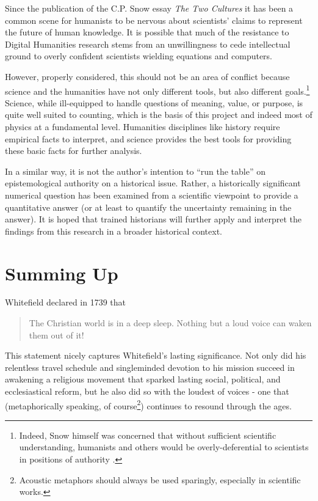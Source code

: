 Since the publication of the C.P. Snow essay {\it The Two Cultures} \cite{Snow1959} it has been a common scene for humanists to be nervous about scientists' claims to represent the future of human knowledge. It is possible that much of the resistance to Digital Humanities research stems from an unwillingness to cede intellectual ground to overly confident scientists wielding equations and computers. 

However, properly considered, this should not be an area of conflict because science and the humanities have not only different tools, but also different goals.\footnote{Indeed, Snow himself was concerned that without sufficient scientific understanding, humanists and others would be overly-deferential to scientists in positions of authority \cite{Snow1960}.} Science, while ill-equipped to handle questions of meaning, value, or purpose, is quite well suited to counting, which is the basis of this project and indeed most of physics at a fundamental level. Humanities disciplines like history require empirical facts to interpret, and science provides the best tools for providing these basic facts for further analysis. 

In a similar way, it is not the author's intention to ``run the table'' on epistemological authority on a historical issue. Rather, a historically significant numerical question has been examined from a scientific viewpoint to provide a quantitative answer (or at least to quantify the uncertainty remaining in the answer). It is hoped that trained historians will further apply and interpret the findings from this research in a broader historical context.

\section{Summing Up}

Whitefield declared in 1739 that

\begin{quote}
The Christian world is in a deep sleep. Nothing but a loud voice can waken them out of it! \cite{Vaudry2003}
\end{quote}

\noindent This statement nicely captures Whitefield's lasting significance. Not only did his relentless travel schedule and singleminded devotion to his mission succeed in awakening a religious movement that sparked lasting social, political, and ecclesiastical reform, but he also did so with the loudest of voices - one that (metaphorically speaking, of course\footnote{Acoustic metaphors should always be used sparingly, especially in scientific works.}) continues to resound through the ages.

